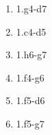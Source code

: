 \begin{enumerate}
\setcounter{enumi}{\value{d_counter}}
\item 1.\bishop{}g4-d7\mate{}
\item 1.\bishop{}c4-d5\mate{}
\item 1.\bishop{}h6-g7\mate{}
\item 1.\knight{}f4-g6\mate{}
\item 1.\knight{}f5-d6\mate{}
\item 1.\knight{}f5-g7\mate{}
\setcounter{d_counter}{\value{enumi}}
\end{enumerate}